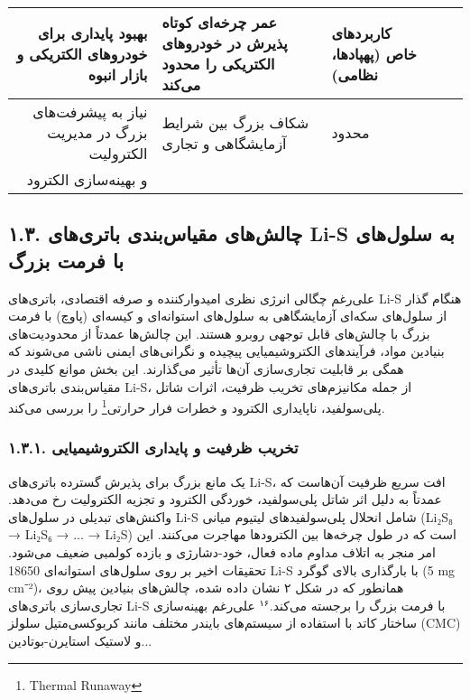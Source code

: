 \documentclass[12pt,a4paper,twocolumn]{article} %
\newcommand{\persian}[1]{\textfarsi{#1}}
\newcommand{\english}[1]{\textenglish{#1}}
\newcommand{\farsibold}[1]{{\farsifontbold{#1}}}
\begin{document}
\begin{table*}[t]
\begin{tabular}{rllll}
        \hline
        \persian{بهبود پایداری برای خودروهای الکتریکی و بازار انبوه} & \persian{عمر چرخه‌ای کوتاه پذیرش در خودروهای الکتریکی را محدود می‌کند} & \persian{کاربردهای خاص (پهپادها، نظامی)} & \farsibold{کاربردها} \\
        \hline
        \persian{نیاز به پیشرفت‌های بزرگ در مدیریت الکترولیت} & \persian{شکاف بزرگ بین شرایط آزمایشگاهی و تجاری} & \persian{محدود} & \farsibold{قابلیت تجاری‌سازی} \\
        \persian{و بهینه‌سازی الکترود} & & & \\
        \bottomrule
    \end{tabular}
\end{table*}

\subsection*{\persian{۱.۳. چالش‌های مقیاس‌بندی باتری‌های \english{Li-S} به سلول‌های با فرمت بزرگ}}
\persian{
علی‌رغم چگالی انرژی نظری امیدوارکننده و صرفه اقتصادی، باتری‌های \english{Li-S} هنگام گذار از سلول‌های سکه‌ای آزمایشگاهی به سلول‌های استوانه‌ای و کیسه‌ای (پاوچ) با فرمت بزرگ با چالش‌های قابل توجهی روبرو هستند. این چالش‌ها عمدتاً از محدودیت‌های بنیادین مواد، فرآیندهای الکتروشیمیایی پیچیده و نگرانی‌های ایمنی ناشی می‌شوند که همگی بر قابلیت تجاری‌سازی آن‌ها تأثیر می‌گذارند. این بخش موانع کلیدی در مقیاس‌بندی باتری‌های \english{Li-S}، از جمله مکانیزم‌های تخریب ظرفیت، اثرات شاتل پلی‌سولفید، ناپایداری الکترود و خطرات فرار حرارتی\footnote{\english{Thermal Runaway}} را بررسی می‌کند.
}
\subsubsection*{\persian{۱.۳.۱. تخریب ظرفیت و پایداری الکتروشیمیایی}}
\persian{
یک مانع بزرگ برای پذیرش گسترده باتری‌های \english{Li-S}، افت سریع ظرفیت آن‌هاست که عمدتاً به دلیل اثر شاتل پلی‌سولفید، خوردگی الکترود و تجزیه الکترولیت رخ می‌دهد. واکنش‌های تبدیلی در سلول‌های \english{Li-S} شامل انحلال پلی‌سولفیدهای لیتیوم میانی (\english{Li₂S₈ → Li₂S₆ → ... → Li₂S}) است که در طول چرخه‌ها بین الکترودها مهاجرت می‌کنند. این امر منجر به اتلاف مداوم ماده فعال، خود-دشارژی و بازده کولمبی ضعیف می‌شود.
}
\persian{
تحقیقات اخیر بر روی سلول‌های استوانه‌ای \english{18650 Li-S} با بارگذاری بالای گوگرد (\english{5 mg cm⁻²})، همانطور که در شکل ۲ نشان داده شده، چالش‌های بنیادین پیش روی تجاری‌سازی باتری‌های \english{Li-S} با فرمت بزرگ را برجسته می‌کند.$^{۱۶}$ علی‌رغم بهینه‌سازی ساختار کاتد با استفاده از سیستم‌های بایندر مختلف مانند کربوکسی‌متیل سلولز (\english{CMC}) و لاستیک استایرن-بوتادین...
}
\end{document}
